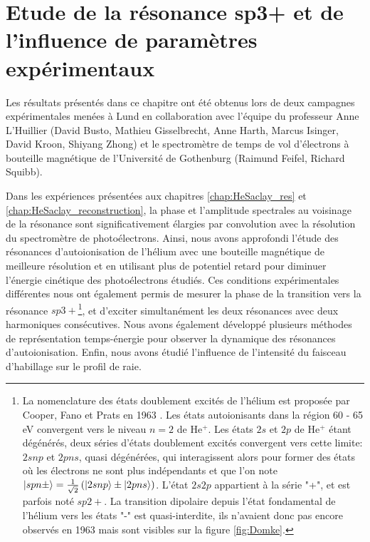 \chapter[Etude de la résonance sp3+ et de l'influence de paramètres expérimentaux]{Etude de la résonance \MakeLowercase{sp3+} et de l'influence de paramètres expérimentaux}
Les résultats présentés dans ce chapitre ont été obtenus lors de deux campagnes expérimentales menées à Lund en collaboration avec l'équipe du professeur Anne L'Huillier (David Busto, Mathieu Gisselbrecht, Anne Harth, Marcus Isinger, David Kroon, Shiyang Zhong) et le spectromètre de temps de vol d'électrons à bouteille magnétique de l'Université de Gothenburg (Raimund Feifel, Richard Squibb).


Dans les expériences présentées aux chapitres \ref{chap:HeSaclay_res} et \ref{chap:HeSaclay_reconstruction}, la phase et l'amplitude spectrales au voisinage de la résonance sont significativement élargies par convolution avec la résolution du spectromètre de photoélectrons. Ainsi, nous avons approfondi l'étude des résonances d'autoionisation de l'hélium avec une bouteille magnétique de meilleure résolution et en utilisant plus de potentiel retard pour diminuer l'énergie cinétique des photoélectrons étudiés. Ces conditions expérimentales différentes nous ont également permis de mesurer la phase de la transition vers la résonance $sp3+$\footnote{La nomenclature des états doublement excités de l'hélium est proposée par Cooper, Fano et Prats en 1963 . Les états autoionisants dans la région 60 - 65 eV convergent vers le niveau $n = 2$ de He$^+$. Les états $2s$ et $2p$ de He$^+$ étant dégénérés, deux séries d'états doublement excités convergent vers cette limite: $2snp$ et $2pns$, quasi dégénérées, qui interagissent alors pour former des états où les électrons ne sont plus indépendants et que l'on note $\ket{spn \pm} = \frac{1}{\sqrt{2}} \left( \ket{2snp} \pm \ket{2pns} \right)$. L'état $2s2p$ appartient à la série "+", et est parfois noté $sp2+$. La transition dipolaire depuis l'état fondamental de l'hélium vers les états "-" est quasi-interdite, ils n'avaient donc pas encore observés en 1963 mais sont visibles sur la figure \ref{fig:Domke}.}, et d'exciter simultanément les deux résonances avec deux harmoniques consécutives. Nous avons également développé plusieurs méthodes de représentation temps-énergie pour observer la dynamique des résonances d'autoionisation. Enfin, nous avons étudié l'influence de l'intensité du faisceau d'habillage sur le profil de raie.

